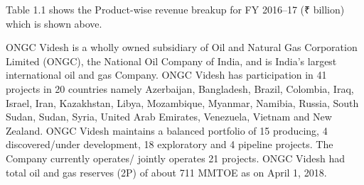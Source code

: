 \noindent Table 1.1 shows the Product-wise revenue breakup for FY 2016–17 (₹ billion) which is shown above.

\vspace{2em}


\noindent ONGC Videsh is a wholly owned subsidiary of Oil and Natural Gas Corporation Limited (ONGC), 
the National Oil Company of India, and is India’s largest international oil and gas Company. 
ONGC Videsh has participation in 41 projects in 20 countries namely Azerbaijan, Bangladesh, Brazil, 
Colombia, Iraq, Israel, Iran, Kazakhstan, Libya, Mozambique, Myanmar, Namibia, Russia, South Sudan, Sudan,
Syria, United Arab Emirates, Venezuela, Vietnam and New Zealand. ONGC Videsh maintains 
a balanced portfolio of 15 producing, 4 discovered/under development, 18 exploratory and 4 pipeline projects. 
The Company currently operates/ jointly operates 21 projects. ONGC Videsh had total oil and gas reserves (2P) 
of about 711 MMTOE as on April 1, 2018.



